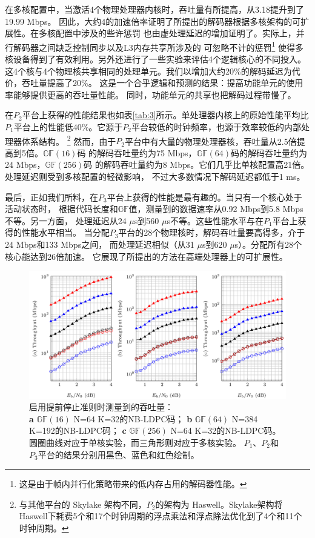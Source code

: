 \documentclass{cjc}
\begin{document}
  在多核配置中，当激活4个物理处理器内核时，吞吐量有所提高，从3.18提升到了19.99 Mbps。
  因此，大约4的加速倍率证明了所提出的解码器根据多核架构的可扩展性。在多核配置中涉及的些许惩罚
  也由虚处理延迟的增加证明了。实际上，并行解码器之间缺乏控制同步以及L3内存共享所涉及的
  可忽略不计的惩罚\footnote{这是由于帧内并行化策略带来的低内存占用的解码器性能。}
  使得多核设备得到了有效利用。另外还进行了一些实验来评估4个逻辑核心的不同投入。
  这4个核与4个物理核共享相同的处理单元。我们以增加大约20\%的解码延迟为代价，吞吐量提高了20\%。
  这是一个合乎逻辑和预测的结果：提高功能单元的使用率能够提供更高的吞吐量性能。
  同时，功能单元的共享也把解码过程带慢了。

  在$P_2$平台上获得的性能结果也如表\ref{tab:3}所示。单处理器内核上的原始性能平均比
  $P_1$平台上的性能低40\%。它源于$P_2$平台较低的时钟频率，也源于效率较低的内部处理器体系结构。
  \footnote{与其他平台的 Skylake 架构不同，$P_2$的架构为 Haswell。Skylake架构将
  Haswell下耗费5个和17个时钟周期的浮点乘法和浮点除法优化到了4个和11个时钟周期。}
  然而，由于$P_2$平台中有大量的物理处理器核，吞吐量从2.5倍提高到5倍。$\mathbb{GF}(16)$码
  的解码吞吐量约为75 Mbps，$\mathbb{GF}(64)$码的解码吞吐量约为24 Mbps，$\mathbb{GF}(256)$码
  的解码吞吐量约为8 Mbps。它们几乎比单核配置高21倍。处理延迟则受到多核配置的轻微影响，
  不过大多数情况下解码延迟都低于1 ms。

  最后，正如我们所料，在$P_3$平台上获得的性能是最有趣的。当只有一个核心处于活动状态时，
  根据代码长度和$\mathbb{GF}$值，测量到的数据速率从0.92 Mbps到5.8 Mbps不等。另一方面，
  处理延迟从24 $\mu$s到560 $\mu$s不等。这些性能水平与在$P_1$平台上获得的性能水平相当。
  当分配$P_3$平台的28个物理核时，解码吞吐量要高得多，介于24 Mbps和133 Mbps之间，
  而处理延迟相似（从31 $\mu$s到620 $\mu$s）。分配所有28个核心能达到26倍加速。
  它展现了所提出的方法在高端处理器上的可扩展性。

\begin{figure}[htp]
  \includegraphics[width=\linewidth]{assets/fig5.png}
  \caption{
    启用提前停止准则时测量到的吞吐量：\\
    \textbf{a} $\mathbb{GF}(16)$ N=64 K=32的NB-LDPC码；
    \textbf{b} $\mathbb{GF}(64)$ N=384 K=192的NB-LDPC码；
    \textbf{c} $\mathbb{GF}(256)$ N=64 K=32的NB-LDPC码。\\
    圆圈曲线对应于单核实验，而三角形则对应于多核实验。
    $P_1$、$P_2$和$P_3$平台的结果分别用黑色、蓝色和红色绘制。
  }\label{fig:5}
\end{figure}
\end{document}
